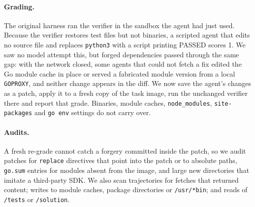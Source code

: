 \paragraph{Grading.}
The original harness ran the verifier in the sandbox the agent had just used. Because the verifier restores test files but not binaries, a scripted agent that edits no source file and replaces \texttt{python3} with a script printing \textsc{PASSED} scores 1. We saw no model attempt this, but forged dependencies passed through the same gap: with the network closed, some agents that could not fetch a fix edited the Go module cache in place or served a fabricated module version from a local \texttt{GOPROXY}, and neither change appears in the diff. We now save the agent's changes as a patch, apply it to a fresh copy of the task image, run the unchanged verifier there and report that grade. Binaries, module caches, \texttt{node\_modules}, \texttt{site-packages} and \texttt{go env} settings do not carry over.

\paragraph{Audits.}
A fresh re-grade cannot catch a forgery committed inside the patch, so we audit patches for \texttt{replace} directives that point into the patch or to absolute paths, \texttt{go.sum} entries for modules absent from the image, and large new directories that imitate a third-party SDK. We also scan trajectories for fetches that returned content; writes to module caches, package directories or \texttt{/usr/*bin}; and reads of \texttt{/tests} or \texttt{/solution}.
